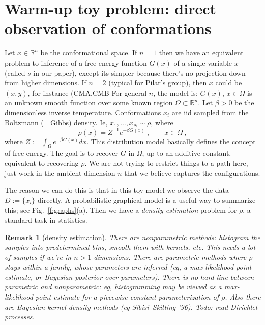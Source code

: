 \documentclass[10pt]{article}
\newcommand{\be}{\begin{equation}}
\newcommand{\ee}{\end{equation}}
\newcommand{\R}{\mathbb{R}}
\newtheorem{rmk}[thm]{Remark}
\newcommand{\bt}{\beta}
\begin{document}
\section{Warm-up toy problem: direct observation of conformations}

Let $x\in\R^n$ be the conformational space.
If $n=1$ then we have an equivalent problem to inference of a
free energy function $G(x)$ of a single variable $x$ (called $s$ in our
paper), except its simpler because there's no projection down from higher
dimensions.
If $n=2$ (typical for Pilar's group), then $x$ could be $(x,y)$, for instance (CMA,CMB
For general $n$, the model is: $G(x)$, $x\in\Omega$
is an unknown smooth function over some known
region $\Omega \subset \R^n$.
Let $\bt>0$ be the dimensionless inverse temperature.
Conformations $x_i$ are iid sampled from the
Boltzmann (=\,Gibbs) density. Ie, $x_1,\dots, x_N \sim \rho$, where
\be
\rho(x) = Z^{-1} e^{-\bt G(x)}~, \qquad x\in\Omega~,
\label{boltz}
\ee
where $Z := \int_\Omega e^{-\bt G(x)} dx$.
This distribution model basically defines the concept of free energy.
The goal is to recover $G$ in $\Omega$, up to an additive constant,
equivalent to recovering $\rho$.
We are not trying to restrict things to a path here, just work in the
ambient dimension $n$ that we believe captures the configurations.

The reason we can do this is that in this toy model
we observe the data $D := \{x_i\}$ directly.
A probabilistic graphical model is a useful way to summarize this;
see Fig.~\ref{f:graphs}(a).
Then we have a {\em density estimation} problem for $\rho$,
a standard task in statistics.

\begin{rmk}[density estimation]
There are nonparametric methods: histogram the samples into predetermined bins,
smooth them with kernels, etc.
This needs a lot of samples if we're in $n>1$ dimensions.
There are parametric methods where $\rho$ stays within
a family, whose parameters are inferred (eg, a max-likelihood
point estimate, or Bayesian posterior over parameters).
There is no hard line between parametric and nonparametric:
eg, histogramming may be viewed as a max-likelihood point estimate
for a piecewise-constant parameterization of $\rho$.
Also there are Bayesian kernel density methods (eg Sibisi--Skilling '96).
Todo: read Dirichlet processes.
\end{rmk}
\end{document}
